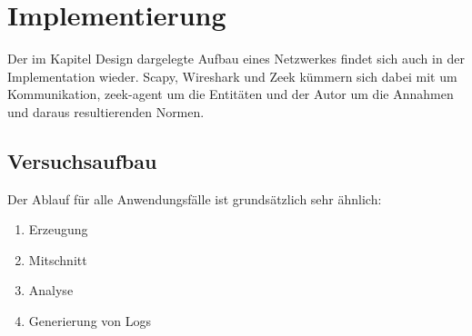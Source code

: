 
\chapter{Implementierung}%
\label{cha:implementation}





Der im Kapitel Design dargelegte Aufbau eines Netzwerkes findet sich auch in der Implementation wieder. Scapy, Wireshark und Zeek kümmern sich dabei mit um Kommunikation, zeek-agent um die Entitäten und der Autor um die Annahmen und daraus resultierenden Normen.

\section{Versuchsaufbau}
Der Ablauf für alle Anwendungsfälle ist grundsätzlich sehr ähnlich:
\begin{enumerate}
\item{Erzeugung}
\item{Mitschnitt}
\item{Analyse}
\item{Generierung von Logs}
\end{enumerate}
